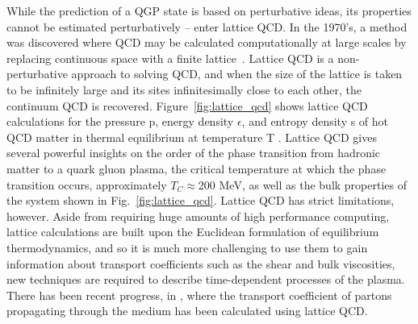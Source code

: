 While the prediction of a QGP state is based on perturbative ideas, its properties cannot be estimated perturbatively -- enter lattice QCD. In the 1970's, a method was discovered where QCD may be calculated computationally at large scales by replacing continuous space with a finite lattice~\cite{Wilson1974}. Lattice QCD is a non-perturbative approach to solving QCD, and when the size of the lattice is taken to be infinitely large and its sites infinitesimally close to each other, the continuum QCD is recovered. Figure~\ref{fig:lattice_qcd} shows lattice QCD calculations for the  pressure p, energy density $\epsilon$, and entropy density s of hot QCD matter in thermal equilibrium at temperature T \cite{Borsanyi2014,HotQCDCollaboration2014}. Lattice QCD gives several powerful insights on the order of the phase transition from hadronic matter to a quark gluon plasma, the critical temperature at which the phase transition occurs, approximately $T_C\approx$200 MeV, as well as the bulk properties of the system shown in Fig.~\ref{fig:lattice_qcd}. Lattice QCD has strict limitations, however. Aside from requiring huge amounts of high performance computing, lattice calculations are built upon the Euclidean formulation of equilibrium thermodynamics, and so it is much more challenging to use them to gain information about transport coefficients such as the shear and bulk viscosities, new techniques are required to describe time-dependent processes of the plasma. There has been recent progress, in \cite{Kumar2021}, where the transport coefficient of partons propagating through the medium has been calculated using lattice QCD.


